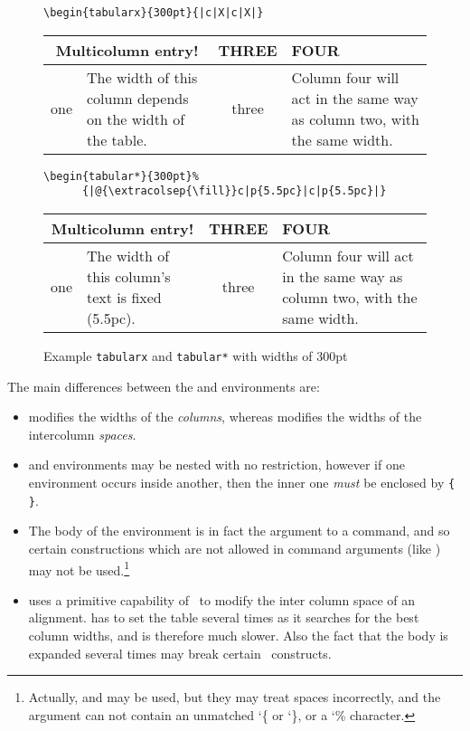 \begin{figure}
\centering
\caption{Example \texttt{tabularx} and \texttt{tabular*} with widths of 300pt}
\verb?\begin{tabularx}{300pt}{|c|X|c|X|}?

 \begin{tabularx}{300pt}{|c|X|c|X|}
 \hline
 \multicolumn{2}{|c|}{Multicolumn entry!}&
 THREE&
 FOUR\\
 \hline
 one&
 \raggedright\arraybackslash The width of this column depends on the
 width of the table.&
 three&
 \raggedright\arraybackslash Column four will act in the same way as
 column two, with the same width.\\
 \hline
 \end{tabularx}

\vspace{\onelineskip}
\verb?\begin{tabular*}{300pt}%? \\
\verb?      {|@{\extracolsep{\fill}}c|p{5.5pc}|c|p{5.5pc}|}?
 
 \begin{tabular*}{300pt}{|@{\extracolsep{\fill}}c|p{5.5pc}|c|p{5.5pc}|}
 \hline
 \multicolumn{2}{|c|}{Multicolumn entry!}&
 THREE&
 FOUR\\
 \hline
 one&
 \raggedright\arraybackslash The width of this column's text is fixed (5.5pc). &
 three &
 \raggedright\arraybackslash Column four will act in the same way as
 column two, with the same width.\\
 \hline
 \end{tabular*}
\end{figure}



     The main differences between the  and 
environments are:
 \begin{itemize}
 \item {} modifies the widths 
 of the \emph{columns},
 whereas  modifies the widths of the 
 intercolumn  \emph{spaces}.
 \item {} and  environments may be
 nested with no restriction, however if one 
 environment occurs inside another, then the inner one \emph{must} be
 enclosed by \verb?{ }?.
 \item The body of the  environment is in fact the
 argument to a command, and so certain constructions which are not
 allowed in command arguments (like \cmd{\verb}) may not be used.\footnote
 {Actually,  and  may be used, but they may 
 treat spaces incorrectly, and the
 argument can not contain an unmatched {\ttfamily\char`\{} or
 {\ttfamily\char`\}}, or a  {\ttfamily\char`\%} character.}
 \item {} uses a primitive capability of \tx\ to
 modify the inter column space of an alignment. 
 has to set the table several times as it searches for the best column
 widths, and is therefore much slower. Also the fact that the body is
 expanded several times may break certain \tx\ constructs.
 \end{itemize}


